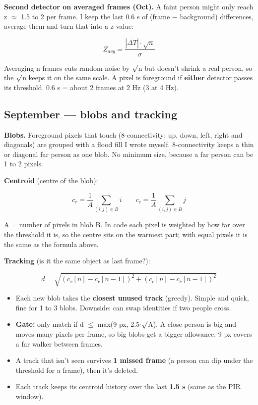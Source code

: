 \documentclass[11pt,a4paper]{article}
\providecommand{\tightlist}{\setlength{\itemsep}{0pt}\setlength{\parskip}{0pt}}
\begin{document}
\textbf{Second detector on
averaged frames (Oct).} A
faint person might only reach
z $\approx$ 1.5 to 2 per frame. I keep
the last 0.6 s of (frame $-$
background) differences,
average them and turn that
into a z value:

\[
Z_{avg} = \frac{|\overline{\Delta T}|\cdot\sqrt{n}}{\sigma}
\]

Averaging n frames cuts random
noise by $\surd$n but doesn't shrink
a real person, so the $\surd$n keeps
it on the same scale. A pixel
is foreground if
\textbf{either} detector
passes its threshold. 0.6 s =
about 2 frames at 2 Hz (3 at 4
Hz).

\hypertarget{september-blobs-and-tracking}{%
\subsection{September ---
blobs and
tracking}\label{september-blobs-and-tracking}}

\textbf{Blobs.} Foreground
pixels that touch
(8-connectivity: up, down,
left, right and diagonals) are
grouped with a flood fill I
wrote myself. 8-connectivity
keeps a thin or diagonal far
person as one blob. No minimum
size, because a far person can
be 1 to 2 pixels.

\textbf{Centroid} (centre of
the blob):

\[
c_r = \frac{1}{A}\sum_{(i,j)\in B} i \qquad c_c = \frac{1}{A}\sum_{(i,j)\in B} j
\]

A = number of pixels in blob
B. In code each pixel is
weighted by how far over the
threshold it is, so the centre
sits on the warmest part; with
equal pixels it is the same as
the formula above.

\textbf{Tracking} (is it the
same object as last frame?):

\[
d = \sqrt{(c_r[n]-c_r[n-1])^2 + (c_c[n]-c_c[n-1])^2}
\]

\begin{itemize}
\tightlist
\item
  Each new blob takes the
  \textbf{closest unused
  track} (greedy). Simple and
  quick, fine for 1 to 3
  blobs. Downside: can swap
  identities if two people
  cross.
\item
  \textbf{Gate:} only match if
  d $\leq$ max(9 px, 2.5$\cdot$$\surd$A). A
  close person is big and
  moves many pixels per frame,
  so big blobs get a bigger
  allowance. 9 px covers a far
  walker between frames.
\item
  A track that isn't seen
  survives \textbf{1 missed
  frame} (a person can dip
  under the threshold for a
  frame), then it's deleted.
\item
  Each track keeps its
  centroid history over the
  last \textbf{1.5 s} (same as
  the PIR window).
\end{itemize}
\end{document}
